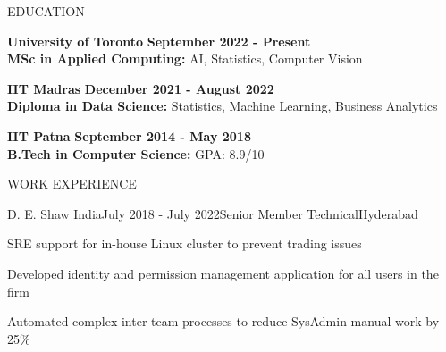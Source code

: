 \documentclass{resume}
\begin{document}
  \begin{rSection}{EDUCATION}

    {\bf University of Toronto} \hfill {\bf September 2022 - Present} \\
    {\bf MSc in Applied Computing:} AI, Statistics, Computer Vision

    {\bf IIT Madras} \hfill {\bf December 2021 - August 2022} \\
    {\bf Diploma in Data Science:} Statistics, Machine Learning, Business Analytics

    {\bf IIT Patna} \hfill {\bf September 2014 - May 2018} \\
    {\bf B.Tech in Computer Science:} GPA: 8.9/10

  \end{rSection}

  \begin{rSection}{WORK EXPERIENCE}
  
    \begin{rSubsection}{D. E. Shaw India}{July 2018 - July 2022}{Senior Member Technical}{Hyderabad}
      \item SRE support for in-house Linux cluster to prevent trading issues
      \item Developed identity and permission management application for all users in the firm
      \item Automated complex inter-team processes to reduce SysAdmin manual work by 25\%
    \end{rSubsection}
  
  \end{rSection}
\end{document}
